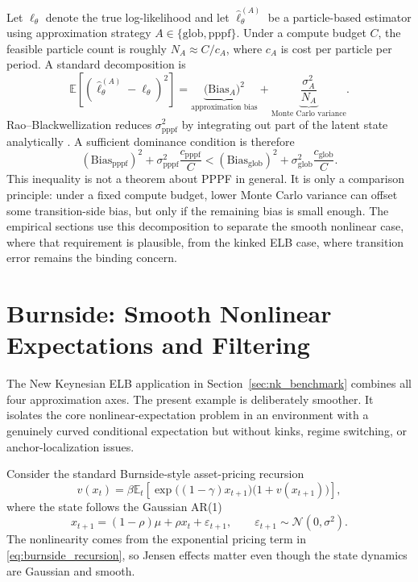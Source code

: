 \documentclass[11pt]{article}
\theoremstyle{remark}
\newcommand{\E}{\mathbb{E}}
\begin{document}
Let $\ell_\theta$ denote the true log-likelihood and let $\widehat \ell_\theta^{(A)}$ be a particle-based estimator using approximation strategy $A\in\{\mathrm{glob},\mathrm{pppf}\}$.
Under a compute budget $C$, the feasible particle count is roughly $N_A \approx C/c_A$, where $c_A$ is cost per particle per period.
A standard decomposition is
\[
\E\left[(\widehat \ell_\theta^{(A)}-\ell_\theta)^2\right]
=
\underbrace{\big(\mathrm{Bias}_A\big)^2}_{\text{approximation bias}}
+
\underbrace{\frac{\sigma_A^2}{N_A}}_{\text{Monte Carlo variance}}.
\]
Rao--Blackwellization reduces $\sigma_{\mathrm{pppf}}^2$ by integrating out part of the latent state analytically \citep{DoucetFreitasMurphyRussell2000}.
A sufficient dominance condition is therefore
\[
(\mathrm{Bias}_{\mathrm{pppf}})^2 + \sigma_{\mathrm{pppf}}^2 \frac{c_{\mathrm{pppf}}}{C}
<
(\mathrm{Bias}_{\mathrm{glob}})^2 + \sigma_{\mathrm{glob}}^2 \frac{c_{\mathrm{glob}}}{C}.
\]
This inequality is not a theorem about PPPF in general.
It is only a comparison principle: under a fixed compute budget, lower Monte Carlo variance can offset some transition-side bias, but only if the remaining bias is small enough.
The empirical sections use this decomposition to separate the smooth nonlinear case, where that requirement is plausible, from the kinked ELB case, where transition error remains the binding concern.

\section{Burnside: Smooth Nonlinear Expectations and Filtering}
\label{sec:toy}

The New Keynesian ELB application in Section~\ref{sec:nk_benchmark} combines all four approximation axes.
The present example is deliberately smoother.
It isolates the core nonlinear-expectation problem in an environment with a genuinely curved conditional expectation but without kinks, regime switching, or anchor-localization issues.

Consider the standard Burnside-style asset-pricing recursion
\begin{equation}
v(x_t)=\beta \E_t\!\left[\exp\!\big((1-\gamma)x_{t+1}\big)\bigl(1+v(x_{t+1})\bigr)\right],
\label{eq:burnside_recursion}
\end{equation}
where the state follows the Gaussian AR(1)
\begin{equation}
x_{t+1}=(1-\rho)\mu+\rho x_t+\varepsilon_{t+1},
\qquad
\varepsilon_{t+1}\sim\mathcal{N}(0,\sigma^2).
\label{eq:burnside_state}
\end{equation}
The nonlinearity comes from the exponential pricing term in \eqref{eq:burnside_recursion}, so Jensen effects matter even though the state dynamics are Gaussian and smooth.
\end{document}
